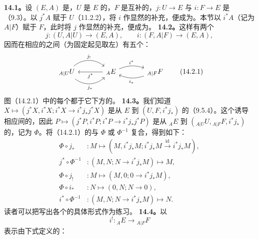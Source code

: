 \textbf{14.1。}设 $(E,A)$ 是，$U$ 是 $E$ 的，$F$ 是互补的，$j:U\to E$ 与 $i:F\to E$ 是（9.3）。以 $j^*A$ 赋于 $U$（11.2.2），将 $i$ 作显然的补充，便成为。本节以 $i^*A$（记为 $A|F$）赋于 $F$，此时将 $j$ 作显然的补充，便成为。
\textbf{14.2。}这样有两个
\[j:(U,A|U)\longrightarrow(E,A),\qquad i:(F,A|F)\longrightarrow(E,A),\]
因而在相应的之间（为固定起见取左）有五个：
\[
\begin{tikzcd}[column sep=large]
{}_{A|U}U \arrow[r,bend left=40,"j_!"] \arrow[r,bend right=40,swap,"j_*"] & {}_AE \arrow[l,"j^*"] \arrow[r,bend left=20,"i^*"] & {}_{A|F}F\arrow[l,bend left=20,"i_*"]
\end{tikzcd}\tag{14.2.1}
\]
图（14.2.1）中的每个都于它下方的。
\textbf{14.3。}我们知道 $X\mapsto(j^*X,i^*X;i^*X\to i^*j_*j^*X)$ 是从 $E$ 到 $(U,F,i^*j_*)$ 的（9.5.4）。这个诱导相应间的，因此 $P\mapsto(j^*P,i^*P;i^*P\to i^*j_*j^*P)$ 是从 ${}_AE$ 到 $({}_{A|U}U,{}_{A|F}F,i^*j_*)$ 的，记为 $\Phi$。将（14.2.1）的与 $\Phi$ 或 $\Phi^{-1}$ 复合，得到如下：
\begin{align*}
\Phi\circ j_* &: M\longmapsto(M,i^*j_*M;i^*j_*M\xrightarrow{\mathrm{id}}i^*j_*M),\\
j^*\circ\Phi^{-1}&:(M,N;N\to i^*j_*M)\longmapsto M,\\
\Phi\circ j_!&:M\longmapsto(M,0;0\to i^*j_*M),\\
\Phi\circ i_*&:N\longmapsto(0,N;N\to0),\\
i^*\circ\Phi^{-1}&:(M,N;N\to i^*j_*M)\longmapsto N.
\end{align*}
读者可以把写出各个的具体形式作为练习。
\textbf{14.4。}以
\[i^!:{}_AE\longrightarrow{}_{A|F}F\tag{14.4.1}\]
表示由下式定义的：

